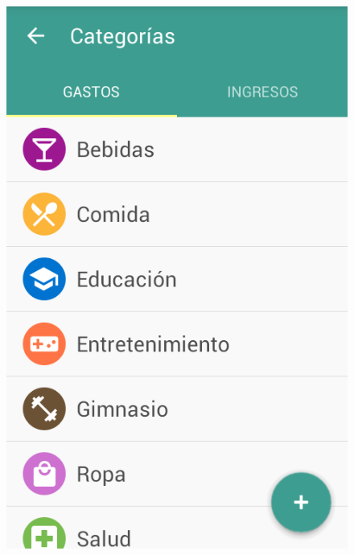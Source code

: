 \begin{figure}[ht]
\centering
\begin{minipage}{.5\textwidth}
  \centering
  \includegraphics[scale=0.4,type=png,ext=.png,read=.png]{imagenes/expense_categories}
  \captionsetup{justification=centering}
  \label{fig:interfazListarExpenseCategories}
\end{minipage}%
\begin{minipage}{.5\textwidth}
\centering

\end{minipage}
\end{figure}
